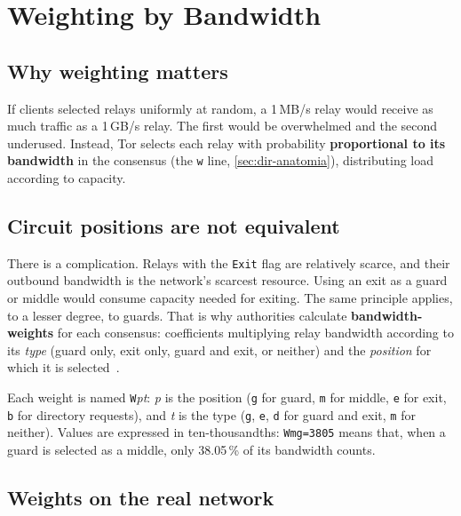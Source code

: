 \section{Weighting by Bandwidth}\label{sec:percorso-pesi}

\subsection{Why weighting matters}

If clients selected relays uniformly at random, a 1\,MB/s relay would receive as much traffic as a 1\,GB/s relay. The first would be overwhelmed and the second underused. Instead, Tor selects each relay with probability \textbf{proportional to its bandwidth} in the consensus (the \texttt{w} line, \cref{sec:dir-anatomia}), distributing load according to capacity.

\subsection{Circuit positions are not equivalent}

There is a complication. Relays with the \texttt{Exit} flag are relatively scarce, and their outbound bandwidth is the network's scarcest resource. Using an exit as a guard or middle would consume capacity needed for exiting. The same principle applies, to a lesser degree, to guards. That is why authorities calculate \textbf{bandwidth-weights} for each consensus: coefficients multiplying relay bandwidth according to its \emph{type} (guard only, exit only, guard and exit, or neither) and the \emph{position} for which it is selected~.

Each weight is named \texttt{W}\emph{pt}: \emph{p} is the position (\texttt{g} for guard, \texttt{m} for middle, \texttt{e} for exit, \texttt{b} for directory requests), and \emph{t} is the type (\texttt{g}, \texttt{e}, \texttt{d} for guard and exit, \texttt{m} for neither). Values are expressed in ten-thousandths: \texttt{Wmg=3805} means that, when a guard is selected as a middle, only 38.05\,\% of its bandwidth counts.

\subsection{Weights on the real network}

